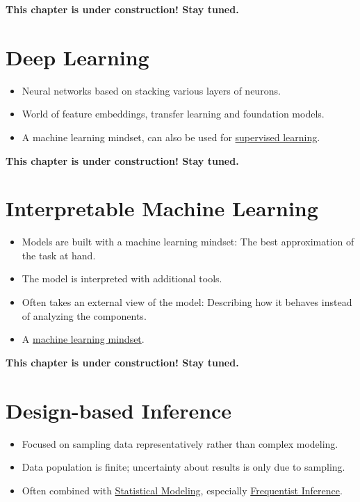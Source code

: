 \documentclass[
  10pt,
]{scrbook}
\providecommand{\tightlist}{%
  \setlength{\itemsep}{0pt}\setlength{\parskip}{0pt}}
\begin{document}
\textbf{This chapter is under construction! Stay tuned.}

\hypertarget{deep-learning}{%
\chapter{Deep Learning}\label{deep-learning}}

\begin{itemize}
\tightlist
\item
  Neural networks based on stacking various layers of neurons.
\item
  World of feature embeddings, transfer learning and foundation models.
\item
  A machine learning mindset, can also be used for \protect\hyperlink{supervised-ml}{supervised learning}.
\end{itemize}

\textbf{This chapter is under construction! Stay tuned.}

\hypertarget{interpretable-ml}{%
\chapter{Interpretable Machine Learning}\label{interpretable-ml}}

\begin{itemize}
\tightlist
\item
  Models are built with a machine learning mindset: The best approximation of the task at hand.
\item
  The model is interpreted with additional tools.
\item
  Often takes an external view of the model: Describing how it behaves instead of analyzing the components.
\item
  A \protect\hyperlink{machine-learning}{machine learning mindset}.
\end{itemize}

\textbf{This chapter is under construction! Stay tuned.}

\hypertarget{design-based-inference}{%
\chapter{Design-based Inference}\label{design-based-inference}}

\begin{itemize}
\tightlist
\item
  Focused on sampling data representatively rather than complex modeling.
\item
  Data population is finite; uncertainty about results is only due to sampling.
\item
  Often combined with \protect\hyperlink{statistical-modeling}{Statistical Modeling}, especially \protect\hyperlink{frequentist-inference}{Frequentist Inference}.
\end{itemize}
\end{document}
